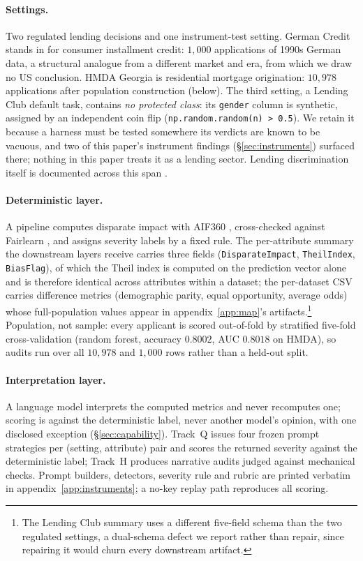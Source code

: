 \documentclass[sigconf,nonacm]{acmart}
\begin{document}
\paragraph{Settings.} Two regulated lending decisions and one instrument-test
setting. German Credit \citep{germancredit} stands in for consumer installment
credit: $1{,}000$ applications of 1990s German data, a structural analogue
from a different market and era, from which we draw no US conclusion. HMDA
Georgia
\citep{hmda} is residential mortgage origination: $10{,}978$ applications
after population construction (below). The third setting, a Lending Club
default task, contains \emph{no protected class}: its \texttt{gender} column
is synthetic, assigned by an independent coin flip
(\texttt{np.random.random(n) > 0.5}). We retain it because a harness must be
tested somewhere its verdicts are known to be vacuous, and two of this paper's
instrument findings (\S\ref{sec:instruments}) surfaced there; nothing in this
paper treats it as a lending sector. Lending discrimination itself is
documented across this span \citep{duarte2012,pope2011,bartlett2019,butler2017,sarwal2024}.

\paragraph{Deterministic layer.} A pipeline computes disparate impact with
AIF360 \citep{aif360}, cross-checked against Fairlearn \citep{fairlearn}, and
assigns severity labels by a fixed rule. The per-attribute summary the
downstream layers receive carries three fields (\texttt{DisparateImpact},
\texttt{TheilIndex}, \texttt{BiasFlag}), of which the Theil index is
computed on the prediction vector alone and is therefore identical across
attributes within a dataset; the per-dataset CSV carries difference metrics
(demographic parity, equal opportunity, average odds) whose full-population
values appear in appendix~\ref{app:map}'s artifacts.\footnote{The Lending Club
summary uses a different five-field schema than the two regulated settings,
a dual-schema defect we report rather than repair, since repairing it would
churn every downstream artifact.} Population, not sample: every applicant is
scored out-of-fold by stratified five-fold cross-validation (random forest,
accuracy $0.8002$, AUC $0.8018$ on HMDA), so audits run over all $10{,}978$
and $1{,}000$ rows rather than a held-out split.

\paragraph{Interpretation layer.} A language model interprets the computed
metrics and never recomputes one; scoring is against the deterministic label,
never another model's opinion, with one disclosed exception
(\S\ref{sec:capability}). Track~Q issues four frozen prompt strategies per
(setting, attribute) pair and scores the returned severity against the
deterministic label; Track~H produces narrative audits judged against
mechanical checks. Prompt builders, detectors, severity rule and rubric are
printed verbatim in appendix~\ref{app:instruments}; a no-key replay path
reproduces all scoring.
\end{document}
